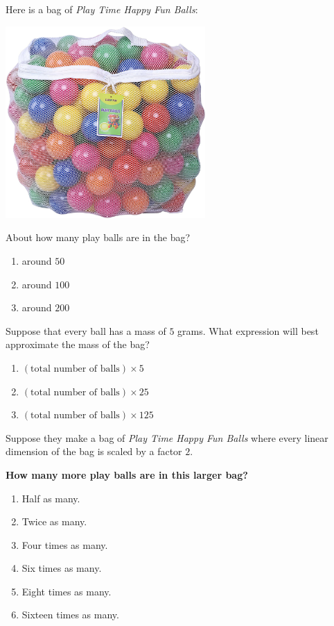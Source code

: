 \documentclass[handout,noauthor,nooutcomes]{ximera}
\author{Bart Snapp}
\begin{document}
\maketitle


\begin{exercise}
  Here is a bag of \textit{Play Time Happy Fun Balls}:
  \begin{center}
    \includegraphics[width=3in]{ballsInBag.jpg}
  \end{center}
  About how many play balls are in the bag?
  \begin{enumerate}
  \item around $50$
  \item around $100$
  \item around $200$
  \end{enumerate}
\end{exercise}


\begin{exercise}
  Suppose that every ball has a mass of $5$ grams.  What expression
  will best approximate the mass of the bag?
  \begin{enumerate}
  \item $(\text{total number of balls})\times5$
  \item $(\text{total number of balls})\times25$
  \item $(\text{total number of balls})\times125$
  \end{enumerate}
\end{exercise}


\begin{exercise}
  Suppose they make a bag of \textit{Play Time Happy Fun Balls} where
  every linear dimension of the bag is scaled by a factor $2$.

  
  \textbf{How many more play balls are in this larger bag?}
  \begin{multicols}{2}
  \begin{enumerate}
  \item Half as many.
  \item Twice as many.
  \item Four times as many.
  \item Six times as many.
  \item Eight times as many.
  \item Sixteen times as many.
  \end{enumerate}
  \end{multicols}
\end{exercise}
\end{document}
